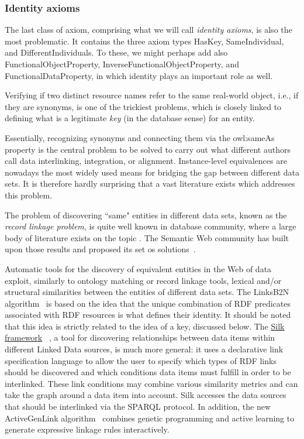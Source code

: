 \documentclass[a4paper]{article}
\newcounter{ex}
\begin{document}
\subsubsection{Identity axioms}

The last class of axiom, comprising what we will call \emph{identity axioms},
is also the most problematic. It contains the three axiom types
\textsf{HasKey}, \textsf{SameIndividual}, and \textsf{DifferentIndividuals}.
To these, we might perhaps add also \textsf{FunctionalObjectProperty},
\textsf{InverseFunctionalObjectProperty}, and \textsf{FunctionalDataProperty},
in which identity plays an important role as well.

Verifying if two distinct resource names refer to the same real-world object,
i.e., if they are synonyms,
is one of the trickiest problems, which is closely linked to defining what is a
legitimate \emph{key} (in the database sense) for an entity.

Essentially, recognizing synonyms and connecting them via the \textsf{owl:sameAs}
property is the central problem to be solved to carry out what different authors
call data interlinking, integration, or alignment. Instance-level equivalences are
nowadays the most widely used means for bridging the gap between different data sets.
It is therefore hardly surprising that a vast literature exists which addresses
this problem.

The problem of discovering ``same" entities in different data sets, known as
the \emph{record linkage problem}, is quite well known in database community,
where a large body of literature exists on the topic \cite{Winkler2006}.
The Semantic Web community has built upon those results and proposed its set
os solutions~\cite{EuzenatShvaiko2007}.

Automatic tools for the discovery of equivalent entities
in the Web of data exploit, similarly to ontology matching or record linkage
tools, lexical and/or structural similarities between the entities of different
data sets.
The LinksB2N algorithm~\cite{IseleJentzschBizer2010,SalvadoresEtAl2009} is based
on the idea that the unique combination of RDF predicates associated with RDF
resources is what defines their identity. It should be noted that this idea
is strictly related to the idea of a key, discussed below.
The \href{http://wifo5-03.informatik.uni-mannheim.de/bizer/silk/}{Silk framework}~%
\cite{IseleJentzschBizer2010},
a tool for discovering relationships between data items within different Linked Data sources,
is much more general: it uses a declarative link specification language
to allow the user to specify which types of RDF links should be discovered
and which conditions data items must fulfill in order to be interlinked.
These link conditions may combine various similarity metrics and can take
the graph around a data item into account. Silk accesses the data sources
that should be interlinked via the SPARQL protocol. 
In addition, the new ActiveGenLink algorithm~\cite{IseleBizer2013}
combines genetic programming and active learning to generate expressive linkage
rules interactively.
\end{document}
